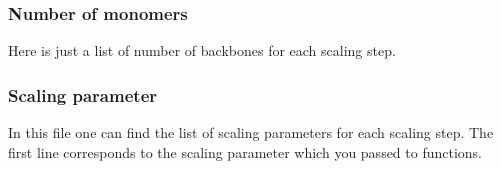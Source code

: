 \documentclass[12pt]{article}
\begin{document}
\begin{mySection}
\subsubsection{Number of monomers}
Here is just a list of number of backbones for each scaling step. 

\subsubsection{Scaling parameter}
In this file one can find the list of scaling parameters for each scaling step. The first line corresponds to the scaling parameter which you passed to  functions.



\end{mySection}


\end{document}
